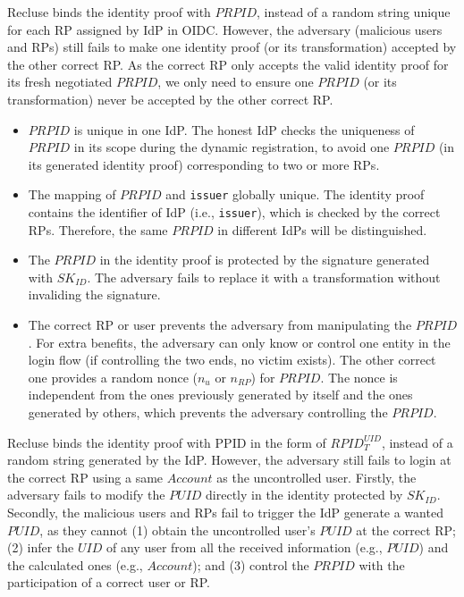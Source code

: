 Recluse binds the identity proof with $PRPID$, instead of a random string unique for each RP assigned by IdP in OIDC. However, the adversary (malicious users and RPs) still fails to  make one identity proof (or its transformation) accepted by the other correct RP. As the correct RP only accepts the valid identity proof for its fresh negotiated $PRPID$, we only need to ensure one $PRPID$ (or its transformation) never be accepted by the other correct RP.
\begin{itemize}
\item $PRPID$ is unique in one IdP. The honest IdP checks the uniqueness of $PRPID$ in its scope during the dynamic registration, to avoid one $PRPID$ (in its generated identity proof) corresponding to two or more RPs.
\item The mapping of $PRPID$ and \verb+issuer+ globally unique. The identity proof contains the identifier of IdP (i.e., \verb+issuer+), which is checked by the correct RPs. Therefore, the same $PRPID$ in different IdPs will be distinguished.
\item The $PRPID$ in the identity proof is protected by the signature generated with $SK_{ID}$. The adversary fails to replace it with a transformation without invaliding the signature.
\item The correct RP or user prevents the adversary from manipulating the $PRPID$. For extra benefits, the adversary can only know or control one entity in the login flow (if controlling the two ends, no victim exists). The other correct one provides a random nonce ($n_u$ or $n_{RP}$) for $PRPID$. The nonce is independent from the ones previously generated by itself  and the ones generated by others, which prevents the adversary controlling the $PRPID$.

\end{itemize}

Recluse binds the identity proof with PPID  in the form of $RPID_T^{UID}$, instead of a random string generated by the IdP. However, the adversary still fails to login at the correct RP using a same $Account$ as the uncontrolled user. Firstly,  the adversary fails to  modify the $PUID$ directly in the identity protected by $SK_{ID}$. Secondly, the malicious users and RPs fail to trigger the IdP generate a wanted $PUID$, as they cannot (1) obtain the uncontrolled user's $PUID$ at the correct RP; (2) infer the $UID$ of any user from all the received  information (e.g., $PUID$) and the calculated ones (e.g., $Account$); and (3) control the $PRPID$ with the participation of a correct user or RP.

